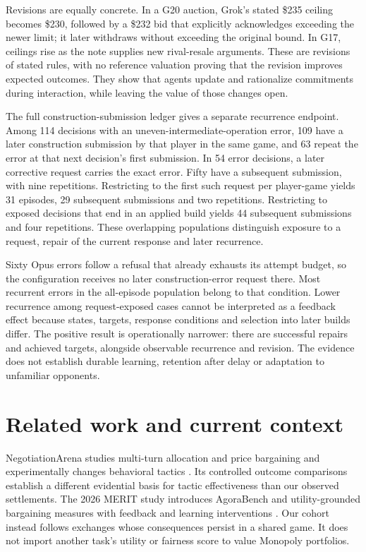 Revisions are equally concrete. In a G20 auction, Grok's stated \$235 ceiling becomes \$230, followed by a \$232 bid that explicitly acknowledges exceeding the newer limit; it later withdraws without exceeding the original bound. In G17, ceilings rise as the note supplies new rival-resale arguments. These are revisions of stated rules, with no reference valuation proving that the revision improves expected outcomes. They show that agents update and rationalize commitments during interaction, while leaving the value of those changes open.

The full construction-submission ledger gives a separate recurrence endpoint. Among 114 decisions with an uneven-intermediate-operation error, 109 have a later construction submission by that player in the same game, and 63 repeat the error at that next decision's first submission. In 54 error decisions, a later corrective request carries the exact error. Fifty have a subsequent submission, with nine repetitions. Restricting to the first such request per player-game yields 31 episodes, 29 subsequent submissions and two repetitions. Restricting to exposed decisions that end in an applied build yields 44 subsequent submissions and four repetitions. These overlapping populations distinguish exposure to a request, repair of the current response and later recurrence.

Sixty Opus errors follow a refusal that already exhausts its attempt budget, so the configuration receives no later construction-error request there. Most recurrent errors in the all-episode population belong to that condition. Lower recurrence among request-exposed cases cannot be interpreted as a feedback effect because states, targets, response conditions and selection into later builds differ. The positive result is operationally narrower: there are successful repairs and achieved targets, alongside observable recurrence and revision. The evidence does not establish durable learning, retention after delay or adaptation to unfamiliar opponents.

\section{Related work and current context}

NegotiationArena studies multi-turn allocation and price bargaining and experimentally changes behavioral tactics \citep{bianchi2024negotiationarena}. Its controlled outcome comparisons establish a different evidential basis for tactic effectiveness than our observed settlements. The 2026 MERIT study introduces AgoraBench and utility-grounded bargaining measures with feedback and learning interventions \citep{merit2026}. Our cohort instead follows exchanges whose consequences persist in a shared game. It does not import another task's utility or fairness score to value Monopoly portfolios.

